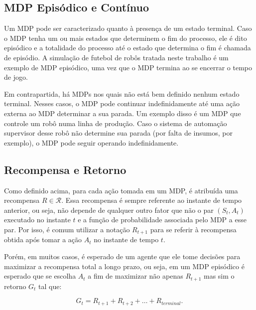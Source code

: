 \subsection{MDP Episódico e Contínuo}

Um MDP pode ser caracterizado quanto à presença de um estado terminal. Caso o MDP tenha um ou mais estados que determinem o fim do processo, ele é dito episódico e a totalidade do processo até o estado que determina o fim é chamada de episódio. A simulação de futebol de robôs tratada neste trabalho é um exemplo de MDP episódico, uma vez que o MDP termina ao se encerrar o tempo de jogo.

Em contrapartida, há MDPs nos quais não está bem definido nenhum estado terminal. Nesses casos, o MDP pode continuar indefinidamente até uma ação externa ao MDP determinar a sua parada. Um exemplo disso é um MDP que controle um robô numa linha de produção. Caso o sistema de automação supervisor desse robô não determine sua parada (por falta de insumos, por exemplo), o MDP pode seguir operando indefinidamente.


\subsection{Recompensa e Retorno}

Como definido acima, para cada ação tomada em um MDP, é atribuída uma recompensa $R \in \mathcal{R}$. Essa recompensa é sempre referente ao instante de tempo anterior, ou seja, não depende de qualquer outro fator que não o par $(S_t, A_t)$ executado no instante $t$ e a função de probabilidade associada pelo MDP a esse par. Por isso, é comum utilizar a notação $R_{t+1}$ para se referir à recompensa obtida após tomar a ação $A_t$ no instante de tempo $t$.

Porém, em muitos casos, é esperado de um agente que ele tome decisões para maximizar a recompensa total a longo prazo, ou seja, em um MDP episódico é esperado que se escolha $A_t$ a fim de maximizar não apenas $R_{t+1}$ mas sim o retorno $G_{t}$ tal que:

\begin{equation}
G_{t} = R_{t+1} + R_{t+2} + \dotsc + R_{terminal}.
\end{equation}

